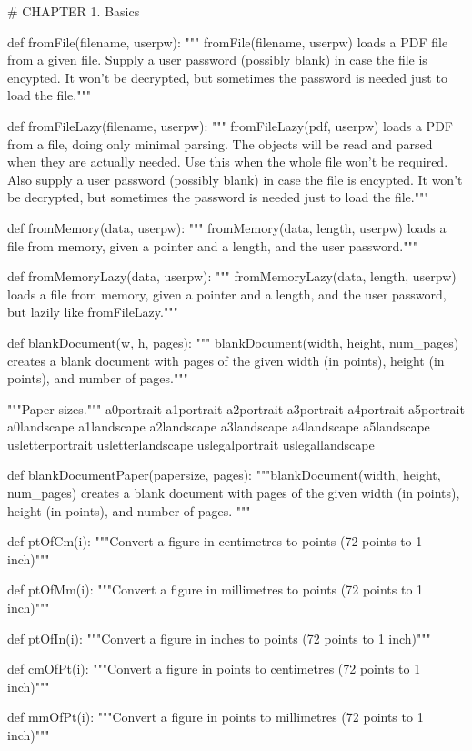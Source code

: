 # CHAPTER 1. Basics

def fromFile(filename, userpw):
    """ fromFile(filename, userpw) loads a PDF file from a given file.
    Supply a user password (possibly blank) in case the file is encypted. It
    won't be decrypted, but sometimes the password is needed just to load the
    file."""

def fromFileLazy(filename, userpw):
    """ fromFileLazy(pdf, userpw) loads a PDF from a file, doing only
    minimal parsing. The objects will be read and parsed when they are actually
    needed.  Use this when the whole file won't be required. Also supply a user
    password (possibly blank) in case the file is encypted. It won't be
    decrypted, but sometimes the password is needed just to load the file."""

def fromMemory(data, userpw):
    """ fromMemory(data, length, userpw) loads a file from memory, given a
    pointer and a length, and the user password."""

def fromMemoryLazy(data, userpw):
    """ fromMemoryLazy(data, length, userpw) loads a file from memory, given a
    pointer and a length, and the user password, but lazily like
    fromFileLazy."""

def blankDocument(w, h, pages):
    """ blankDocument(width, height, num_pages) creates a blank document
    with pages of the given width (in points), height (in points), and number
    of pages."""

"""Paper sizes."""
a0portrait
a1portrait
a2portrait
a3portrait
a4portrait
a5portrait
a0landscape
a1landscape
a2landscape
a3landscape
a4landscape
a5landscape
usletterportrait
usletterlandscape
uslegalportrait
uslegallandscape

def blankDocumentPaper(papersize, pages):
    """blankDocument(width, height, num_pages) creates a blank document
    with pages of the given width (in points), height (in points), and number
    of pages. """

def ptOfCm(i):
    """Convert a figure in centimetres to points (72 points to 1 inch)"""

def ptOfMm(i):
    """Convert a figure in millimetres to points (72 points to 1 inch)"""

def ptOfIn(i):
    """Convert a figure in inches to points (72 points to 1 inch)"""

def cmOfPt(i):
    """Convert a figure in points to centimetres (72 points to 1 inch)"""

def mmOfPt(i):
    """Convert a figure in points to millimetres (72 points to 1 inch)"""

